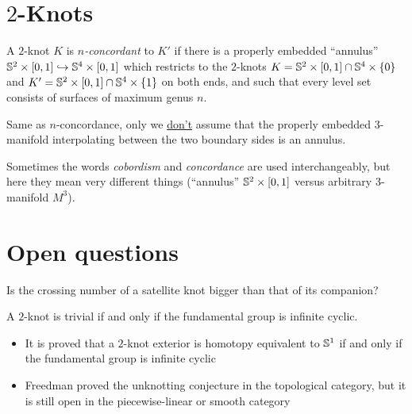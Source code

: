 \section{$2$-Knots}
\begin{definition}[$n$-concordance]
	A $2$-knot $K$ is
	\emph{$n$-concordant} 
	to $K'$
	if there is a properly embedded ``annulus''
	$\mathbb{S}^{2} \times [0,1] \hookrightarrow \mathbb{S}^{4} \times [0,1]$
	which restricts to the $2$-knots
	$K = \mathbb{S}^{2} \times [0, 1] \cap \mathbb{S}^{4} \times \{ 0 \}$
	and
	$K' = \mathbb{S}^{2} \times [0, 1] \cap \mathbb{S}^{4} \times \{ 1 \}$
	on both ends,
	and such that every level set consists
	of surfaces of maximum genus $n$.
\end{definition}
\begin{definition}[$n$-cobordism]
	Same as $n$-concordance, only we
	\underline{don't} assume that the properly embedded
	$3$-manifold interpolating
	between the two boundary sides is an annulus.
\end{definition}
\begin{remark}[Warning]
	Sometimes the words
	\emph{cobordism} and \emph{concordance}
	are used interchangeably,
	but here they mean very different things
	(``annulus'' $\mathbb{S}^{2} \times [0, 1]$ versus
	arbitrary $3$-manifold $M^{3}$).
\end{remark}



\newpage
\section{Open questions}

\begin{openquestion}
	Is the crossing number of a satellite knot bigger than that of its companion?
\end{openquestion}

\begin{openquestion}
	A $2$-knot is trivial if and only if the fundamental group
	is infinite cyclic.
\end{openquestion}

\begin{remark}
	\begin{itemize}
		\item It is proved that a $2$-knot exterior
		is homotopy equivalent to $\mathbb{S}^{1}$ if and only if
		the fundamental group is infinite cyclic
		
		\item Freedman proved the unknotting conjecture in the
		topological category,
		but it is still open in the piecewise-linear or smooth
		category
	\end{itemize}
\end{remark}



